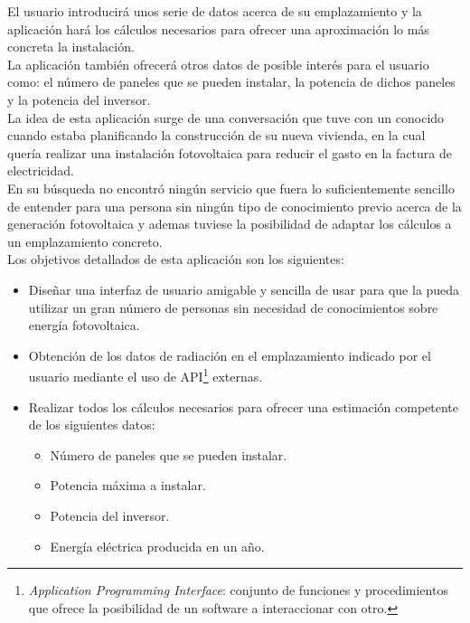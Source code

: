 \documentclass[11pt]{article}
\begin{document}
El usuario introducirá unos serie de datos acerca de su emplazamiento y la aplicación hará los cálculos necesarios para ofrecer una aproximación lo más concreta la instalación.\\

La aplicación también ofrecerá otros datos de posible interés para el usuario como: el número de paneles que se pueden instalar, la potencia de dichos paneles y la potencia del inversor.\\

La idea de esta aplicación surge de una conversación que tuve con un conocido cuando estaba planificando la construcción de su nueva vivienda, en la cual quería realizar una instalación fotovoltaica para reducir el gasto en la factura de electricidad.\\

En su búsqueda no encontró ningún servicio que fuera lo suficientemente sencillo de entender para una persona sin ningún tipo de conocimiento previo acerca de la generación fotovoltaica y ademas tuviese la posibilidad de adaptar los cálculos a un emplazamiento concreto.\\


Los objetivos detallados de esta aplicación son los siguientes:
\begin{itemize}
\item Diseñar una interfaz de usuario amigable y sencilla de usar para que la pueda utilizar un gran número de personas sin necesidad de conocimientos sobre energía fotovoltaica.

\item Obtención de los datos de radiación en el emplazamiento indicado por el usuario mediante el uso de API\footnote{\textit{Application Programming Interface}: conjunto de funciones y procedimientos que ofrece la posibilidad de un software a interaccionar con otro.} externas.
\item Realizar todos los cálculos necesarios para ofrecer una estimación competente de los siguientes datos:

\begin{itemize}

\item Número de paneles que se pueden instalar.
\item Potencia máxima a instalar.
\item Potencia del inversor.
\item Energía eléctrica producida en un año.

\end{itemize}
\end{itemize}
\newpage
\end{document}
